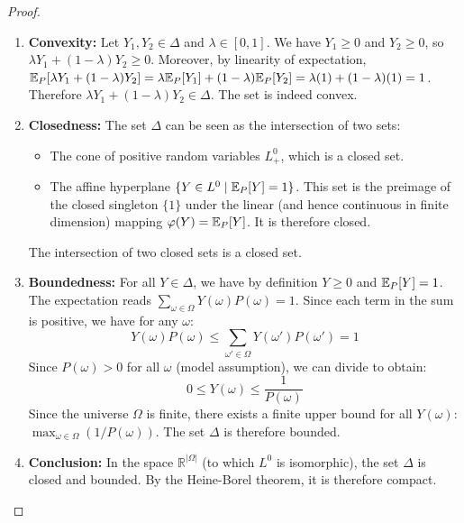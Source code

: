\begin{proof}
\begin{enumerate}
    \item \textbf{Convexity:} Let $Y_1, Y_2 \in \Delta$ and $\lambda \in [0,1]$. We have $Y_1 \ge 0$ and $Y_2 \ge 0$, so $\lambda Y_1 + (1-\lambda)Y_2 \ge 0$. Moreover, by linearity of expectation, $\mathbb{E}_P[\lambda Y_1 + (1-\lambda)Y_2] = \lambda \mathbb{E}_P[Y_1] + (1-\lambda)\mathbb{E}_P[Y_2] = \lambda(1) + (1-\lambda)(1) = 1$. Therefore $\lambda Y_1 + (1-\lambda)Y_2 \in \Delta$. The set is indeed convex.
    \item \textbf{Closedness:} The set $\Delta$ can be seen as the intersection of two sets:
    \begin{itemize}
        \item The cone of positive random variables $L^0_+$, which is a closed set.
        \item The affine hyperplane $\{Y \in L^0 \mid \mathbb{E}_P[Y] = 1\}$. This set is the preimage of the closed singleton $\{1\}$ under the linear (and hence continuous in finite dimension) mapping $\varphi(Y) = \mathbb{E}_P[Y]$. It is therefore closed.
    \end{itemize}
    The intersection of two closed sets is a closed set.
    \item \textbf{Boundedness:} For all $Y \in \Delta$, we have by definition $Y \ge 0$ and $\mathbb{E}_P[Y] = 1$. The expectation reads $\sum_{\omega \in \Omega} Y(\omega)P(\omega) = 1$. Since each term in the sum is positive, we have for any $\omega$:
    \[
    Y(\omega)P(\omega) \le \sum_{\omega' \in \Omega} Y(\omega')P(\omega') = 1
    \]
    Since $P(\omega) > 0$ for all $\omega$ (model assumption), we can divide to obtain:
    \[
    0 \le Y(\omega) \le \frac{1}{P(\omega)}
    \]
    Since the universe $\Omega$ is finite, there exists a finite upper bound for all $Y(\omega)$: $\max_{\omega \in \Omega} (1 / P(\omega))$. The set $\Delta$ is therefore bounded.
    \item \textbf{Conclusion:} In the space $\mathbb{R}^{|\Omega|}$ (to which $L^0$ is isomorphic), the set $\Delta$ is closed and bounded. By the Heine-Borel theorem, it is therefore compact.
\end{enumerate}
\end{proof}

